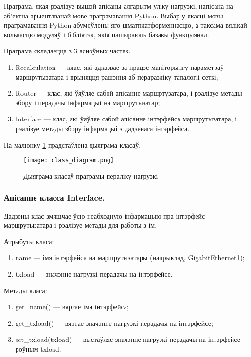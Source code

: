 Праграма, якая рэалізуе вышэй апісаны алгарытм уліку нагрузкі, напісана
на аб'ектна-арыентаванай мове праграмавання Python. Выбар у якасці мовы праграмавання
Python абумоўлены яго шматплатформеннасцю, а таксама вялікай колькасцю модуляў і бібліятэк, якія пашыраюць базавы функцыянал.

Праграма складаецца з 3 асноўных частак:
\begin{enumerate}
    \item Recalculation --- клас, які адказвае за працэс маніторынгу параметраў маршрутызатара і прыняцця рашэння аб
    пераразліку тапалогіі сеткі;
    \item Router --- клас, які ўяўляе сабой апісанне маршртузатара, і рэалізуе
    метады збору і перадачы інфармацыі на маршрутызатар;
    \item Interface --- клас, які ўяўляе сабой апісанне інтэрфейса маршрутызатара,
    і рэалізуе метады збору інфармацыі з дадзенага інтэрфейса.
\end{enumerate}

На малюнку \ref{uml: Class Diagram} прадстаўлена дыяграма класаў.

\clearpage

\begin{figure}[ht!]
    \centering
    \texttt{[image: class\_diagram.png]}
    \caption{Дыяграма класаў праграмы пераліку нагрузкі}
    \label{uml: Class Diagram}
\end{figure}

\vspace{-\baselineskip}

\subsubsection{Апісанне класса Interface.}

Дадзены клас змяшчае ўсю неабходную інфармацыю пра інтэрфейс маршрутызатара і
рэалізуе метады для работы з ім.

Атрыбуты класа:
\begin{enumerate}
    \item name --- імя інтэрфейса на маршрутызатары (напрыклад, GigabitEthernet1);
    \item txload --- значэнне нагрузкі перадачы на інтэрфейсе.
\end{enumerate}

Метады класа:
\begin{enumerate}
    \item get\_name() --- вяртае імя інтэрфейса;
    \item get\_txload() --- вяртае значэнне нагрузкі перадачы на інтэрфейсе;
    \item set\_txload(txload) --- выстаўляе значэнне нагрузкі перадачы на інтэрфейсе
    роўным txload.
\end{enumerate}

